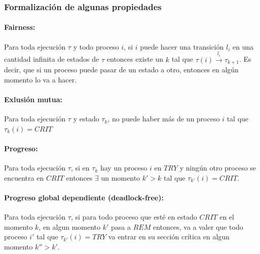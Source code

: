 \subsubsection{Formalización de algunas propiedades}\label{sincro::form}

\paragraph{Fairness:} Para toda ejecución $\tau$ y todo proceso $i$, si $i$ puede hacer una transición $l_i$ en una cantidad infinita de estados de $\tau$ entonces existe un $k$ tal que $\tau(i)\overset{l_i}{\rightarrow}\tau_{k+1}$. Es decir, que si un proceso puede pasar de un estado a otro, entonces en algún momento lo va a hacer.

\paragraph{Exlusión mutua:} Para toda ejecución $\tau$ y estado $\tau_k$, no puede haber más de un proceso $i$ tal que $\tau_k(i) = CRIT$


\paragraph{Progreso:} Para toda ejecución $\tau$, si en $\tau_k$ hay un proceso $i$ en $TRY$ y ningún otro proceso se encuentra en $CRIT$ entonces $\exists$ un momento $k' > k$ tal que $\tau_{k'}(i) = CRIT$.


\paragraph{Progreso global dependiente (deadlock-free):} Para toda ejecución $\tau$, si para todo proceso que esté en estado $CRIT$ en el momento $k$, en algun momento $k'$ pasa a $REM$ entonces, va a valer que todo proceso $i'$ tal que $\tau_{k'}(i) = TRY$ va entrar en su sección crítica en algun momento $k'' > k'$.


